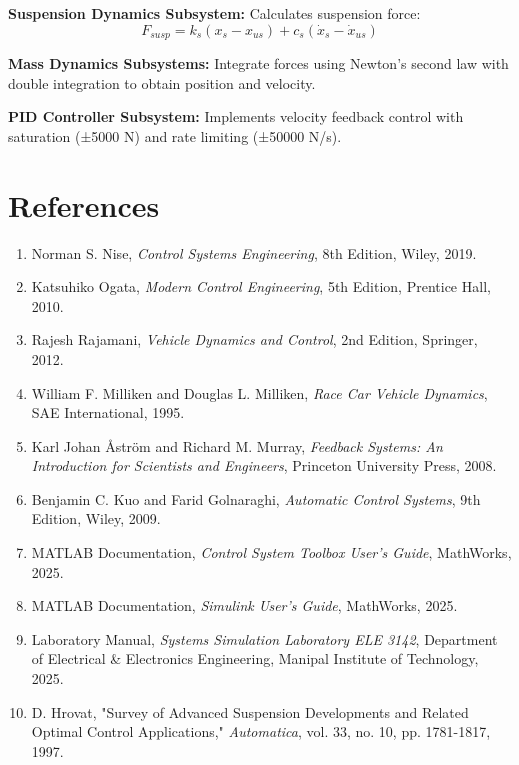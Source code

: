\documentclass[12pt,a4paper]{article}
\begin{document}
\textbf{Suspension Dynamics Subsystem:}
Calculates suspension force:
\begin{equation*}
F_{susp} = k_s(x_s - x_{us}) + c_s(\dot{x}_s - \dot{x}_{us})
\end{equation*}

\textbf{Mass Dynamics Subsystems:}
Integrate forces using Newton's second law with double integration to obtain position and velocity.

\textbf{PID Controller Subsystem:}
Implements velocity feedback control with saturation (±5000 N) and rate limiting (±50000 N/s).

\section{References}

\begin{enumerate}
    \item Norman S. Nise, \textit{Control Systems Engineering}, 8th Edition, Wiley, 2019.
    
    \item Katsuhiko Ogata, \textit{Modern Control Engineering}, 5th Edition, Prentice Hall, 2010.
    
    \item Rajesh Rajamani, \textit{Vehicle Dynamics and Control}, 2nd Edition, Springer, 2012.
    
    \item William F. Milliken and Douglas L. Milliken, \textit{Race Car Vehicle Dynamics}, SAE International, 1995.
    
    \item Karl Johan Åström and Richard M. Murray, \textit{Feedback Systems: An Introduction for Scientists and Engineers}, Princeton University Press, 2008.
    
    \item Benjamin C. Kuo and Farid Golnaraghi, \textit{Automatic Control Systems}, 9th Edition, Wiley, 2009.
    
    \item MATLAB Documentation, \textit{Control System Toolbox User's Guide}, MathWorks, 2025.
    
    \item MATLAB Documentation, \textit{Simulink User's Guide}, MathWorks, 2025.
    
    \item Laboratory Manual, \textit{Systems Simulation Laboratory ELE 3142}, Department of Electrical \& Electronics Engineering, Manipal Institute of Technology, 2025.
    
    \item D. Hrovat, "Survey of Advanced Suspension Developments and Related Optimal Control Applications," \textit{Automatica}, vol. 33, no. 10, pp. 1781-1817, 1997.
\end{enumerate}
\end{document}
